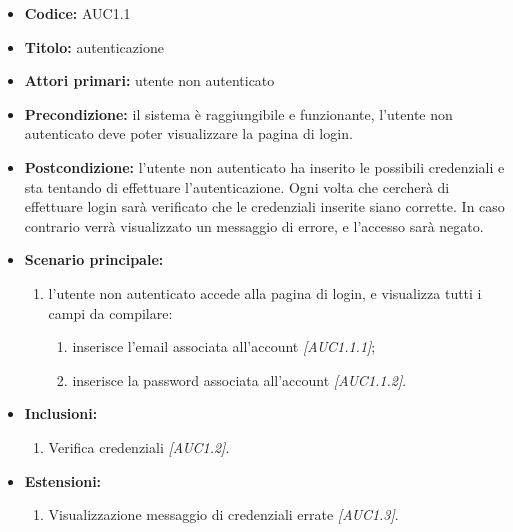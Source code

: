 \documentclass[casi-duso]{subfiles}
\begin{document}
\begin{itemize}
  \item \textbf{Codice:} AUC1.1
  \item \textbf{Titolo:} autenticazione
  \item \textbf{Attori primari:} utente non autenticato
  \item \textbf{Precondizione:} il sistema è raggiungibile e funzionante, l'utente non autenticato deve poter visualizzare la pagina di login.
  \item \textbf{Postcondizione:} l'utente non autenticato ha inserito le possibili credenziali e sta tentando di effettuare l'autenticazione. Ogni volta che cercherà di effettuare
        login sarà verificato che le credenziali inserite siano corrette. In caso contrario verrà visualizzato un messaggio di errore, e l'accesso sarà negato.
  \item \textbf{Scenario principale:}
  \begin{enumerate}
    \item  l'utente non autenticato accede alla pagina di login, e visualizza tutti i campi da compilare:
    \begin{enumerate}
      \item inserisce l’email associata all’account \emph{[AUC1.1.1]};
      \item inserisce la password associata all’account \emph{[AUC1.1.2]}.
    \end{enumerate}
  \end{enumerate}
  \item \textbf{Inclusioni:}
  \begin{enumerate}
    \item Verifica credenziali \emph{[AUC1.2]}.
  \end{enumerate}
  \item \textbf{Estensioni:}
  \begin{enumerate}
    \item Visualizzazione messaggio di credenziali errate \emph{[AUC1.3]}.
  \end{enumerate}
\end{itemize}
\end{document}
